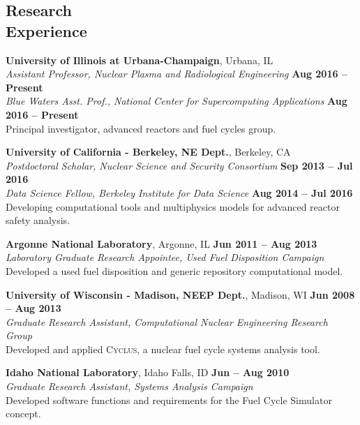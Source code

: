\documentclass[margin,line]{resume}
\newcommand{\Cyclus}{\textsc{Cyclus}\xspace}%
\begin{document}
\begin{resume}
    \section{\mysidestyle Research\\Experience}
    \textbf{University of Illinois at Urbana-Champaign}, Urbana, IL\\
                \textsl{Assistant Professor, Nuclear Plasma and Radiological Engineering} \hfill \textbf{Aug 2016 -- Present}\\
                \textsl{Blue Waters Asst. Prof., National Center for Supercomputing Applications} \hfill \textbf{Aug 2016 -- Present}\\
                Principal investigator, advanced reactors and fuel cycles group.

    \textbf{University of California - Berkeley, NE Dept.}, Berkeley, CA \\
                \textsl{Postdoctoral Scholar, Nuclear Science and Security Consortium} \hfill \textbf{Sep 2013 -- Jul 2016}\\
                \textsl{Data Science Fellow, Berkeley Institute for Data Science} \hfill \textbf{Aug 2014 -- Jul 2016}\\
                Developing computational tools and multiphysics models for advanced reactor safety analysis.

    \textbf{Argonne National Laboratory}, Argonne, IL \hfill \textbf{Jun 2011 -- Aug 2013}\\
                \textsl{Laboratory Graduate Research Appointee, Used Fuel Disposition Campaign}\\
                Developed a used fuel disposition and generic repository computational model.

    \textbf{University of Wisconsin - Madison, NEEP Dept.}, Madison, WI \hfill \textbf{Jun 2008 -- Aug 2013}\\
                \textsl{Graduate Research Assistant, Computational Nuclear Engineering Research Group}\\
                Developed and applied \Cyclus, a nuclear fuel cycle systems analysis tool.

    \textbf{Idaho National Laboratory}, Idaho Falls, ID \hfill \textbf{Jun -- Aug 2010}\\
                \textsl{Graduate Research Assistant, Systems Analysis Campaign}\\
                Developed software functions and requirements for the Fuel Cycle Simulator concept.


\end{resume}
\end{document}
